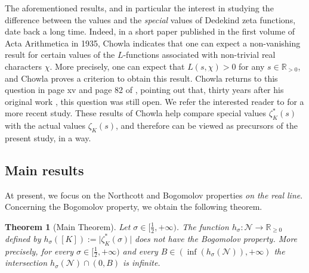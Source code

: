 \documentclass[10pt,a4paper]{amsart}
\theoremstyle{plain}
\newtheorem{theorem}{Theorem}[section]
\theoremstyle{definition}
\theoremstyle{remark}
\begin{document}
The aforementioned results, and in particular the interest in studying the difference between the values and the \textit{special} values of Dedekind zeta functions, date back a long time. Indeed, in a short paper published in the first volume of Acta Arithmetica in 1935, Chowla \cite{Cho35} indicates that one can expect a non-vanishing result for certain values of the $L$-functions associated with non-trivial real characters $\chi$. More precisely, one can expect that $L(s,\chi)>0$ for any $s \in \mathbb{R}_{> 0}$, and Chowla proves a criterion to obtain this result. Chowla returns to this question in page xv and page 82 of \cite{Cho65}, pointing out that, thirty years after his original work \cite{Cho35}, this question was still open. We refer the interested reader to \cite{Lou23} for a more recent study. These results of Chowla help compare special values $\zeta_K^\ast(s)$ with the actual values $\zeta_K(s)$, and therefore can be viewed as precursors of the present study, in a way.

\subsection{Main results}
At present, we focus on the Northcott and Bogomolov properties \textit{on the real line}. Concerning the Bogomolov property, we obtain the following theorem.


\begin{theorem}[Main Theorem]\label{Main theorem}
Let $\sigma \in [\frac{1}{2},+\infty)$.
    The function $h_\sigma \colon \mathcal{N} \to \mathbb{R}_{\geq 0}$ defined by $h_\sigma([K]) := \lvert \zeta^\ast_K(\sigma) \rvert$ does not have the Bogomolov property. More precisely, for every $\sigma \in [\frac{1}{2},+\infty)$ and every $B \in (\inf(h_\sigma(\mathcal{N})),+\infty)$ the intersection $h_\sigma(\mathcal{N}) \cap (0,B)$ is infinite.
\end{theorem}
\end{document}
